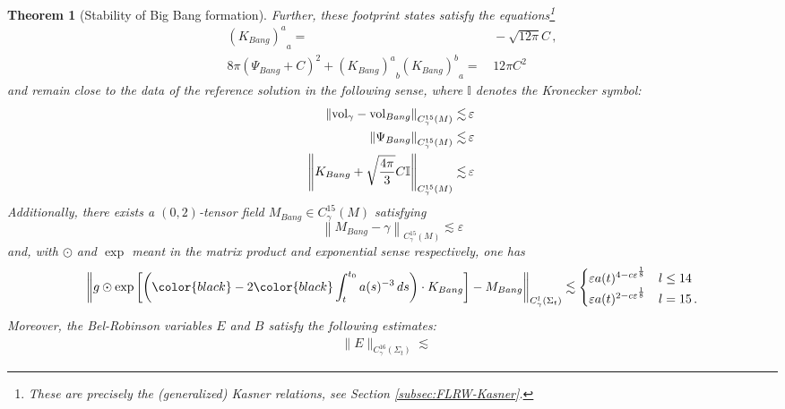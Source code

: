 \documentclass[11pt,leqno,textwidth=10cm]{amsart}
\numberwithin{equation}{section}
\theoremstyle{definition}
\theoremstyle{plain}
\newtheorem{theorem}[definition]{Theorem}
\newcommand{\1}{\mathbbm{1}}
\newcommand{\I}{\mathbb{I}}
\newcommand{\vol}[1]{{\text{\normalfont{vol}}}_{#1}}
\renewcommand{\epsilon}{\varepsilon}
\newcommand{\change}[1]{\color{black}#1\color{black}}
\begin{document}
\begin{theorem}[Stability of Big Bang formation]
\noindent Further, these footprint states satisfy the equations\footnote{These are precisely the (generalized) Kasner relations, see Section \ref{subsec:FLRW-Kasner}.}
\begin{subequations}
\begin{align}
\label{eq:Bang-CMC}{(K_{Bang})^a}_a=&\,-\sqrt{12\pi}C\,,\\
8\pi(\Psi_{Bang}+C)^2+{(K_{Bang})^a}_b{(K_{Bang})^b}_a=&\,12\pi C^2
\label{eq:Bang-Hamil}
\end{align}
\end{subequations}
and remain close to the data of the reference solution in the following sense, where $\I$ denotes the Kronecker symbol:
\begin{subequations}
\begin{align}
\left\|\vol{\gamma}-\vol{Bang}\right\|_{C^{15}_\gamma(M)}\lesssim&\,\epsilon \label{eq:footprint-vol}\\
\left\|\Psi_{Bang}\right\|_{C^{15}_\gamma(M)}\lesssim&\,\epsilon \label{eq:footprint-Psi}\\
\left\|K_{Bang}+\sqrt{\frac{4\pi}3}C\I\right\|_{C^{15}_\gamma(M)}\lesssim&\,\epsilon\,\label{eq:footprint-K}
\end{align}
\end{subequations}
Additionally, there exists a $(0,2)$-tensor field $M_{Bang}\in C^{15}_\gamma(M)$ satisfying
\begin{equation}\label{eq:footprint-G}
\left\|M_{Bang}-\gamma\right\|_{C^{15}_\gamma(M)}\lesssim\epsilon
\end{equation}
and, with $\odot$ and $\exp$ meant in the matrix product and exponential sense respectively, one has
\begin{equation}
\label{eq:asymp-G}\left\|g\odot\exp\left[\left(\change{-2}\int_t^{t_0}a(s)^{-3}\,ds\right)\cdot K_{Bang}\right]-M_{Bang}\right\|_{C^l_\gamma(\Sigma_t)}\lesssim\begin{cases}
 \epsilon a(t)^{4-c\epsilon^\frac18} & l\leq 14\\
\epsilon a(t)^{2-c\epsilon^\frac18} & l=15\,.
\end{cases}
\end{equation}
Moreover, the Bel-Robinson variables $E$ and $B$ satisfy the following estimates:
\begin{subequations}
\begin{align}
\label{eq:asymp-E}\|E\|_{C^{16}_\gamma(\Sigma_t)}\lesssim&\,%

\end{align}
\end{subequations}
\end{theorem}
\end{document}
